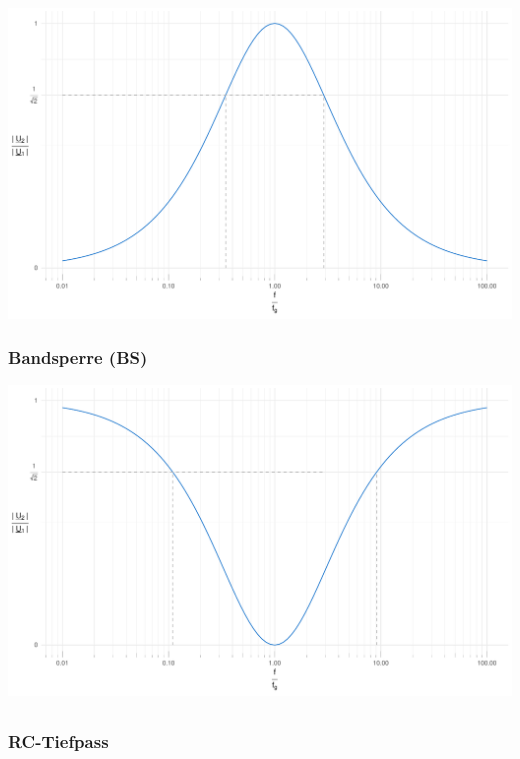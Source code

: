 \documentclass[a4paper, 12pt]{article}
\begin{document}
\begin{center}
    \includegraphics[scale=0.5]{./R/Band/BP/BP_clean.pdf}

  \vspace{0.021276873\paperheight}

  \subsubsection*{Bandsperre (BS)}

    \includegraphics[scale=0.5]{./R/Band/BS/BS_clean.pdf}

  \end{center}

\subsection{}

  \subsubsection*{RC-Tiefpass}
\end{document}
